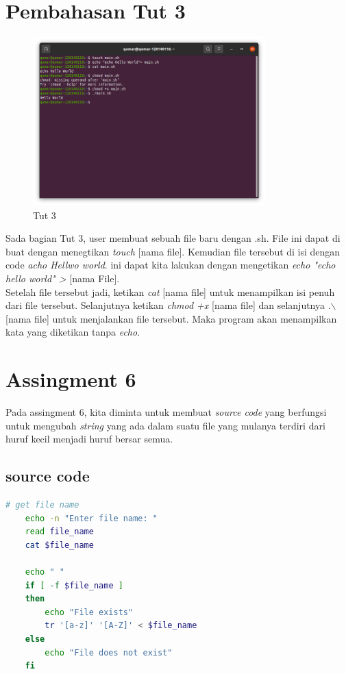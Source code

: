 \documentclass[11pt,a4paper]{article}
\begin{document}
\section{Pembahasan Tut 3}
\begin{figure}[h]
	\centering
	\includegraphics[width=0.8\textwidth ]{figure/tut3.png}
	\caption{Tut 3}
\end{figure}
	Sada bagian Tut 3, user membuat sebuah file baru dengan .sh. File ini dapat di buat dengan menegtikan \textit{touch} [nama file]. Kemudian file tersebut di isi dengan code \textit{acho Hellwo world}. ini dapat kita lakukan dengan mengetikan \textit{echo "echo hello world" >} [nama File].\\
	Setelah file tersebut jadi, ketikan \textit{cat} [nama file] untuk menampilkan isi penuh dari file tersebut.
	Selanjutnya ketikan \textit{chmod +x } [nama file] dan selanjutnya .$\backslash$ [nama file] untuk menjalankan file tersebut. Maka program akan menampilkan kata yang diketikan tanpa \textit{echo}.

\newpage
\section{Assingment 6}
Pada assingment 6, kita diminta untuk membuat \textit{source code} yang berfungsi untuk mengubah \textit{string} yang ada dalam suatu file yang mulanya terdiri dari huruf kecil menjadi
huruf bersar semua.
\subsection*{source code}
\begin{lstlisting}[language=bash, caption={source code Assingment 6}]
	# get file name
	echo -n "Enter file name: "
	read file_name
	cat $file_name

	echo " "
	if [ -f $file_name ]
	then
		echo "File exists"
		tr '[a-z]' '[A-Z]' < $file_name
	else
		echo "File does not exist"
	fi

\end{lstlisting}
\end{document}
